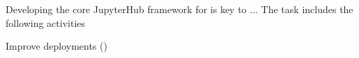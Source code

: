 \begin{task}[title=Developing core JupyterHub infrastructure,
  id=jupyterhub,
  lead=SRL,
  PM=2,
  wphases={0-48},
  partners={SRL,XFEL}
]
  Developing the core JupyterHub framework for is key to ...
  The task includes the following activities
  \begin{compactitem}
  \item Improve deployments
    ()
  \end{compactitem}
\end{task}
